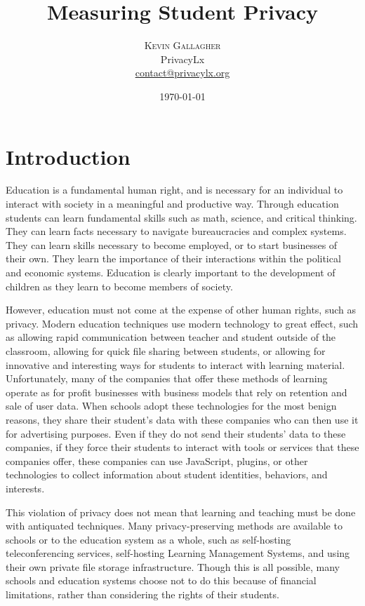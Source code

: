\documentclass[twoside,twocolumn]{article}
\title{Measuring Student Privacy} %
\author{%
\textsc{Kevin Gallagher}\\%
\normalsize PrivacyLx \\ %
\normalsize \href{mailto:contact@privacylx.org}{contact@privacylx.org} %
}
\date{\today} %
\begin{document}
\maketitle


\section{Introduction}

Education is a fundamental human right, and is necessary for an individual to interact with society in a meaningful and productive way. Through education students can learn fundamental skills such as math, science, and critical thinking. They can learn facts necessary to navigate bureaucracies and complex systems. They can learn skills necessary to become employed, or to start businesses of their own. They learn the importance of their interactions within the political and economic systems. Education is clearly important to the development of children as they learn to become members of society.

However, education must not come at the expense of other human rights, such as privacy. Modern education techniques use modern technology to great effect, such as allowing rapid communication between teacher and student outside of the classroom, allowing for quick file sharing between students, or allowing for innovative and interesting ways for students to interact with learning material. Unfortunately, many of the companies that offer these methods of learning operate as for profit businesses with business models that rely on retention and sale of user data. When schools adopt these technologies for the most benign reasons, they share their student's data with these companies who can then use it for advertising purposes. Even if they do not send their students' data to these companies, if they force their students to interact with tools or services that these companies offer, these companies can use JavaScript, plugins, or other technologies to collect information about student identities, behaviors, and interests. 

This violation of privacy does not mean that learning and teaching must be done with antiquated techniques. Many privacy-preserving methods are available to schools or to the education system as a whole, such as self-hosting teleconferencing services, self-hosting Learning Management Systems, and using their own private file storage infrastructure. Though this is all possible, many schools and education systems choose not to do this because of financial limitations, rather than considering the rights of their students.
\end{document}
